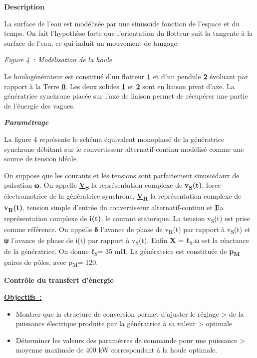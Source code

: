 \textbf{Description}

La surface de l'eau est modélisée par une sinusoïde fonction de l'espace et du temps. On fait l'hypothèse forte que l'orientation du flotteur suit la tangente à la surface de l'eau, ce qui induit un mouvement de tangage.

\emph{Figure 4~: Modélisation de la houle}

Le houlogénérateur est constitué d'un flotteur \textbf{\ul{1}} et d'un pendule \textbf{\ul{2}} évoluant par rapport à la Terre \textbf{\ul{0}}. Les deux solides \textbf{\ul{1}} et \textbf{\ul{2}} sont en liaison pivot d'axe. La génératrice synchrone placée sur l'axe de liaison permet de récupérer une partie de l'énergie des vagues.

\textbf{\emph{Paramétrage~}}

La figure 4 représente le schéma équivalent monophasé de la génératrice synchrone débitant sur le convertisseur alternatif-continu modélisé comme une source de tension idéale.

On suppose que les courants et les tensions sont parfaitement sinusoïdaux de pulsation \textbf{ω}. On appelle \textbf{\ul{V}\textsubscript{S}} la représentation complexe de \textbf{v\textsubscript{S}(t)}, force électromotrice de la génératrice synchrone, \textbf{\ul{V}\textsubscript{R}} la représentation complexe de \textbf{v\textsubscript{R}(t)}, tension simple d'entrée du convertisseur alternatif-continu et \textbf{\ul{I}}la représentation complexe de \textbf{i(t)}, le courant statorique. La tension v\textsubscript{S}(t) est prise comme référence. On appelle \textbf{δ} l'avance de phase de v\textsubscript{R}(t) par rapport à v\textsubscript{S}(t) et \textbf{ψ} l'avance de phase de i(t) par rapport à v\textsubscript{S}(t). Enfin \textbf{X} = ℓ\textsubscript{S}.ω est la réactance de la génératrice. On donne ℓ\textsubscript{S}= 35 mH. La génératrice est constituée de \textbf{p\textsubscript{M}} paires de pôles, avec p\textsubscript{M}= 120.

\textbf{Contrôle du transfert d'énergie}

\textbf{\ul{Objectifs~:}}

\begin{itemize}
\item
  Montrer que la structure de conversion permet d'ajuster le réglage \textgreater{} de la puissance électrique produite par la génératrice à sa valeur \textgreater{} optimale
\item
  Déterminer les valeurs des paramètres de commande pour une puissance \textgreater{} moyenne maximale de 400 kW correspondant à la houle optimale.
\end{itemize}

